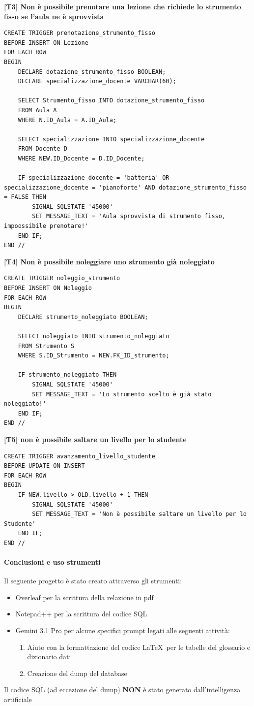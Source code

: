 \newpage
\textbf{[T3] Non è possibile prenotare una lezione che richiede lo strumento fisso se l'aula ne è sprovvista}
\begin{lstlisting}
CREATE TRIGGER prenotazione_strumento_fisso 
BEFORE INSERT ON Lezione
FOR EACH ROW
BEGIN
	DECLARE dotazione_strumento_fisso BOOLEAN; 
	DECLARE specializzazione_docente VARCHAR(60); 
	
	SELECT Strumento_fisso INTO dotazione_strumento_fisso
	FROM Aula A 
	WHERE N.ID_Aula = A.ID_Aula; 
	
	SELECT specializzazione INTO specializzazione_docente
	FROM Docente D
	WHERE NEW.ID_Docente = D.ID_Docente; 
	
	IF specializzazione_docente = 'batteria' OR specializzazione_docente = 'pianoforte' AND dotazione_strumento_fisso = FALSE THEN 
		SIGNAL SQLSTATE '45000' 
		SET MESSAGE_TEXT = 'Aula sprovvista di strumento fisso, impoossibile prenotare!' 
	END IF; 
END // 
\end{lstlisting}
\newpage
\textbf{[T4] Non è possibile noleggiare uno strumento già noleggiato}
\begin{lstlisting}
CREATE TRIGGER noleggio_strumento 
BEFORE INSERT ON Noleggio 
FOR EACH ROW 
BEGIN
	DECLARE strumento_noleggiato BOOLEAN; 
	
	SELECT noleggiato INTO strumento_noleggiato 
	FROM Strumento S
	WHERE S.ID_Strumento = NEW.FK_ID_strumento; 
	
	IF strumento_noleggiato THEN 
		SIGNAL SQLSTATE '45000' 
		SET MESSAGE_TEXT = 'Lo strumento scelto è già stato noleggiato!' 
	END IF; 
END //
\end{lstlisting}
\textbf{[T5] non è possibile saltare un livello per lo studente}
\begin{lstlisting}
CREATE TRIGGER avanzamento_livello_studente 
BEFORE UPDATE ON INSERT
FOR EACH ROW
BEGIN
	IF NEW.livello > OLD.livello + 1 THEN
		SIGNAL SQLSTATE '45000' 
		SET MESSAGE_TEXT = 'Non è possibile saltare un livello per lo Studente' 
	END IF; 
END //
\end{lstlisting}
\newpage
\paragraph{Conclusioni e uso strumenti} Il seguente progetto è stato creato attraverso gli strumenti: 
\begin{itemize}
    \item Overleaf per la scrittura della relazione in pdf
    \item Notepad++ per la scrittura del codice SQL
    \item Gemini 3.1 Pro per alcune specifici prompt legati alle seguenti attività: 
    \begin{enumerate}
        \item Aiuto con la formattazione del codice \LaTeX \ per le tabelle del glossario e dizionario dati
        \item Creazione del dump del database
    \end{enumerate}
\end{itemize}
Il codice SQL (ad eccezione del dump) \textbf{NON} è stato generato dall'intelligenza artificiale

